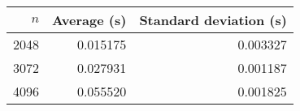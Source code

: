 \begin{tabular}{rrr}
$n$ & Average (s) & Standard deviation (s)\\\hline
2048 & 0.015175 & 0.003327\\
3072 & 0.027931 & 0.001187\\
4096 & 0.055520 & 0.001825\\
\end{tabular}
